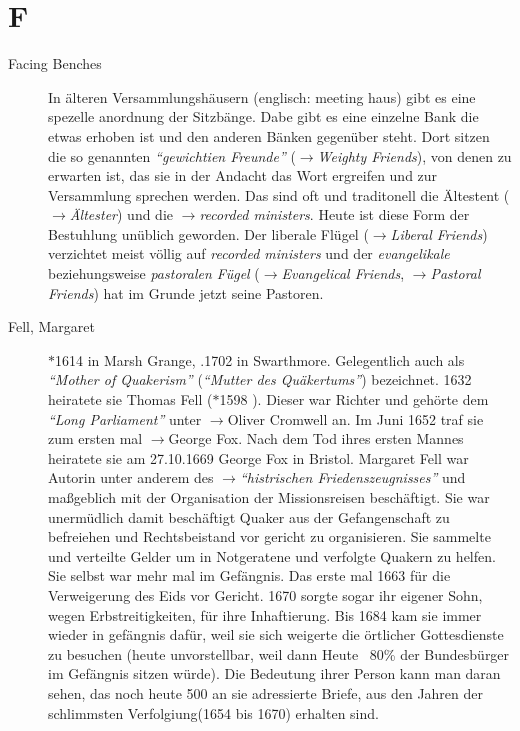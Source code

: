 \section*{F}

\articlesize

\begin{description}

\item[Facing Benches] In älteren Versammlungshäusern (englisch: meeting haus)
gibt es eine spezelle anordnung der Sitzbänge. Dabe gibt es eine einzelne Bank
die etwas erhoben ist und den anderen Bänken gegenüber steht. Dort sitzen die
so genannten \textit{"`gewichtien Freunde"'} ($\to$\textit{Weighty Friends}),
von denen zu erwarten ist, das sie in der Andacht das Wort ergreifen und zur
Versammlung sprechen werden. Das sind oft und traditonell die Ältestent
($\to$\textit{Ältester}) und die $\to$\textit{recorded ministers}. Heute ist
diese Form der Bestuhlung unüblich geworden. Der liberale Flügel
($\to$\textit{Liberal Friends}) verzichtet meist völlig auf
\textit{recorded ministers} und der \textit{evangelikale} beziehungsweise
\textit{pastoralen Fügel} ($\to$\textit{Evangelical Friends},
$\to$\textit{Pastoral Friends}) hat im Grunde jetzt seine Pastoren.

    
 \item[Fell, Margaret] $\ast$1614 in Marsh Grange, .1702 in Swarthmore.
 Gelegentlich auch als \textit{"`Mother of Quakerism"'} (\textit{"`Mutter des
 Quäkertums"'}) bezeichnet. 1632 heiratete sie Thomas Fell ($\ast$1598
 ). Dieser war Richter und gehörte dem \textit{"`Long Parliament"'}
 unter $\to$Oliver Cromwell an. Im Juni 1652 traf sie zum ersten mal
 $\to$George Fox. Nach dem Tod ihres ersten Mannes heiratete sie am 27.10.1669
 George Fox in Bristol. Margaret Fell war Autorin unter anderem des
 $\to$\textit{"`histrischen Friedenszeugnisses"'} und maßgeblich mit der
 Organisation der Missionsreisen beschäftigt.
\medskip 
 Sie war unermüdlich damit
 beschäftigt Quaker aus der Gefangenschaft zu befreiehen und Rechtsbeistand vor
 gericht zu organisieren. Sie sammelte und verteilte Gelder um in Notgeratene
 und verfolgte Quakern zu helfen. Sie selbst war mehr mal im Gefängnis. Das
 erste mal 1663 für die Verweigerung des Eids vor Gericht. 1670
 sorgte sogar ihr eigener Sohn, wegen Erbstreitigkeiten, für ihre Inhaftierung.
 Bis 1684 kam sie immer wieder in gefängnis dafür, weil sie sich weigerte die
 örtlicher Gottesdienste zu besuchen (heute unvorstellbar, weil dann Heute ~80\%
 der Bundesbürger im Gefängnis sitzen würde). Die Bedeutung ihrer Person kann
 man daran sehen, das noch heute 500 an sie adressierte Briefe, aus den Jahren
 der schlimmsten Verfolgiung(1654 bis 1670) erhalten sind.


\end{description}
